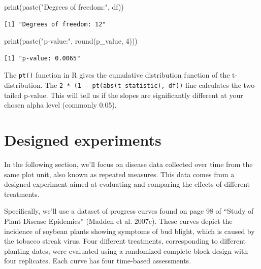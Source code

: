 \documentclass[
  letterpaper,
]{book}
\newenvironment{Shaded}{\begin{snugshade}}{\end{snugshade}}
\newcommand{\DecValTok}[1]{\textcolor[rgb]{0.68,0.00,0.00}{#1}}
\newcommand{\FunctionTok}[1]{\textcolor[rgb]{0.28,0.35,0.67}{#1}}
\newcommand{\NormalTok}[1]{\textcolor[rgb]{0.00,0.23,0.31}{#1}}
\newcommand{\StringTok}[1]{\textcolor[rgb]{0.13,0.47,0.30}{#1}}
\begin{document}
\begin{Shaded}
\begin{Highlighting}[]
\FunctionTok{print}\NormalTok{(}\FunctionTok{paste}\NormalTok{(}\StringTok{"Degrees of freedom:"}\NormalTok{, df))}
\end{Highlighting}
\end{Shaded}

\begin{verbatim}
[1] "Degrees of freedom: 12"
\end{verbatim}

\begin{Shaded}
\begin{Highlighting}[]
\FunctionTok{print}\NormalTok{(}\FunctionTok{paste}\NormalTok{(}\StringTok{"p{-}value:"}\NormalTok{, }\FunctionTok{round}\NormalTok{(p\_value, }\DecValTok{4}\NormalTok{)))}
\end{Highlighting}
\end{Shaded}

\begin{verbatim}
[1] "p-value: 0.0065"
\end{verbatim}

The \texttt{pt()} function in R gives the cumulative distribution
function of the t-distribution. The
\texttt{2\ *\ (1\ -\ pt(abs(t\_statistic),\ df))} line calculates the
two-tailed p-value. This will tell us if the slopes are significantly
different at your chosen alpha level (commonly 0.05).

\hypertarget{designed-experiments}{%
\section{Designed experiments}\label{designed-experiments}}

In the following section, we'll focus on disease data collected over
time from the same plot unit, also known as repeated measures. This data
comes from a designed experiment aimed at evaluating and comparing the
effects of different treatments.

Specifically, we'll use a dataset of progress curves found on page 98 of
``Study of Plant Disease Epidemics'' (Madden et al. 2007c). These curves
depict the incidence of soybean plants showing symptoms of bud blight,
which is caused by the tobacco streak virus. Four different treatments,
corresponding to different planting dates, were evaluated using a
randomized complete block design with four replicates. Each curve has
four time-based assessments.
\end{document}
